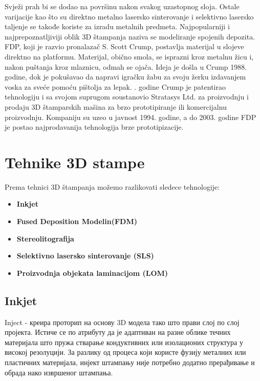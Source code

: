 \documentclass[a4paper]{article}
\begin{document}
{\bigbreak Svježi prah bi se dodao na površinu nakon svakog uzastopnog sloja. Ostale varijacije kao što su direktno metalno lasersko sinterovanje i selektivno lasersko taljenje se takođe koriste za izradu metalnih predmeta. 
\bigbreak Najpopularniji i najprepoznatljiviji oblik 3D štampanja naziva se modeliranje spojenih depozita. FDP, koji je razvio pronalazač S. Scott Crump, postavlja materijal u slojeve direktno na platformu. Materijal, obično smola, se isprazni kroz metalnu žicu i, nakon puštanja kroz mlaznicu, odmah se ojača. Ideja je došla u Crump 1988. godine, dok je pokušavao da napravi igračku žabu za svoju žerku izdavanjem voska za sveće pomoću pištolja za lepak. 
. godine Crump je patentirao tehnologiju i sa svojom suprugom soustanovio Stratasys Ltd. za proizvodnju i prodaju 3D štamparskih mašina za brzo prototipiranje ili komercijalnu proizvodnju. 
Kompaniju su uzeo u javnost 1994. godine, a do 2003. godine FDP je postao najprodavanija tehnologija brze prototipizacije. 

\newpage
\section{Tehnike 3D stampe}
\label{sec:naslov1}
Prema tehnici 3D štampanja možemo razlikovati sledece tehnologije:
\begin{itemize}
\item \textbf{Inkjet}
\item \textbf{Fused Deposition Modelin(FDM)}
\item \textbf{Stereolitografija}
\item \textbf{Selektivno lasersko sinterovanje (SLS)}
\item \textbf{Proizvodnja objekata laminacijom (LOM)}
\end{itemize} 



 


\subsection{Inkjet}
\label{subsec:podnaslov1}
Inject - креира проторип на основу 3D модела тако што прави слој по слој пројекта.
\bigbreak Истиче се по атрибуту да је адаптиван на разне облике течних материјала што пружа стварање кондуктивних или изолационих структура у високој резолуцији. 
\bigbreak За разлику од процеса који користе фузију металних или пластичних материјала, инјект штампању није потребно додатно прерађивање и обрада нако извршеног штампања.


}
\end{document}

